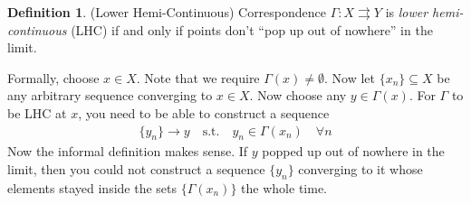\documentclass[12pt]{article}
\numberwithin{equation}{section} %
\theoremstyle{plain}
\theoremstyle{definition}
\newtheorem{defn}[thm]{Definition}
\theoremstyle{remark}
\begin{document}
\begin{defn}{(Lower Hemi-Continuous)}
Correspondence $\Gamma:X\rightrightarrows Y$ is \emph{lower
hemi-continuous} (LHC) if and only if points don't ``pop up out of
nowhere'' in the limit.

Formally, choose $x\in X$. Note that we require
$\Gamma(x)\neq\emptyset$. Now let $\{x_n\}\subseteq X$ be any arbitrary
sequence converging to $x\in X$. Now choose any $y\in\Gamma(x)$.  For
$\Gamma$ to be LHC at $x$, you need to be able to construct a sequence
\begin{align*}
  \{y_n\}\rightarrow y
  \quad\text{s.t.}\quad
  y_n \in \Gamma(x_n) \quad\forall n
\end{align*}
Now the informal definition makes sense. If $y$ popped up out of
nowhere in the limit, then you could not construct a sequence $\{y_n\}$
converging to it whose elements stayed inside the sets
$\{\Gamma({x_n})\}$ the whole time.
\end{defn}
\begin{figure}[htpb!]
\centering
{}
\end{figure}
\end{document}
